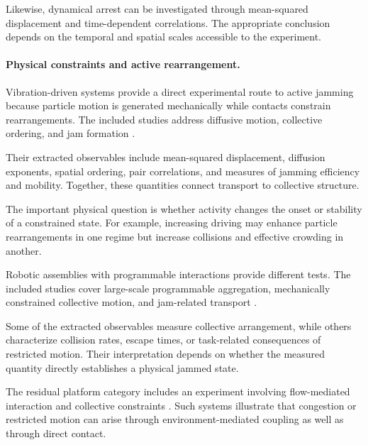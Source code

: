 Likewise, dynamical arrest
can be investigated through
mean-squared displacement
and time-dependent correlations.
The appropriate conclusion
depends on the temporal
and spatial scales accessible
to the experiment.

\paragraph*{Physical constraints and active rearrangement.}

Vibration-driven systems provide
a direct experimental route
to active jamming because
particle motion is generated
mechanically while contacts
constrain rearrangements.
The included studies address
diffusive motion, collective
ordering, and jam formation
\cite{Rozenblit2020diffusivedynamicsa,Dmitriev2021statisticalcorrelat,Rozenblit2025trafficjamformatio}.

Their extracted observables include
mean-squared displacement,
diffusion exponents, spatial
ordering, pair correlations,
and measures of jamming
efficiency and mobility.
Together, these quantities
connect transport to
collective structure.

The important physical question
is whether activity changes
the onset or stability
of a constrained state.
For example, increasing
driving may enhance
particle rearrangements
in one regime but
increase collisions
and effective crowding
in another.



Robotic assemblies with
programmable interactions
provide different tests.
The included studies cover
large-scale programmable
aggregation, mechanically
constrained collective
motion, and jam-related
transport
\cite{Linevich2016robophysicalstudyo,Xiao2023perceptionofmotion,Liu2026noiseenabledgoala,Guzzi2013humanfriendlyrobot,Rubenstein2014programmableselfas}.

Some of the extracted observables
measure collective arrangement,
while others characterize
collision rates, escape times,
or task-related consequences
of restricted motion.
Their interpretation depends
on whether the measured
quantity directly establishes
a physical jammed state.



The residual platform category
includes an experiment involving
flow-mediated interaction and
collective constraints
\cite{Newbolt2024flowinteractionsle}.
Such systems illustrate that
congestion or restricted
motion can arise through
environment-mediated
coupling as well as
through direct contact.

